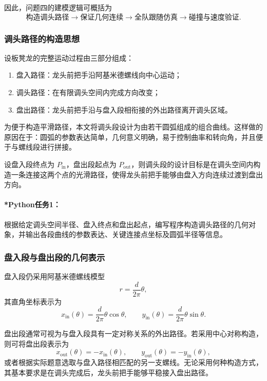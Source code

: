 \documentclass[12pt,a4paper]{ctexart}
\begin{document}
因此，问题四的建模逻辑可概括为
\[
\text{构造调头路径} \longrightarrow \text{保证几何连续} \longrightarrow \text{全队跟随仿真} \longrightarrow \text{碰撞与速度验证}.
\]

\subsubsection{调头路径的构造思想}
设板凳龙的完整运动过程由三部分组成：

\begin{enumerate}
    \item 盘入路径：龙头前把手沿阿基米德螺线向中心运动；
    \item 调头路径：在有限调头空间内完成方向改变；
    \item 盘出路径：龙头前把手沿与盘入段相衔接的外出路径离开调头区域。
\end{enumerate}

为便于构造平滑路径，本文将调头段设计为由若干圆弧组成的组合曲线。这样做的原因在于：圆弧的参数表达简单，几何意义明确，易于控制曲率和转向角，并且便于与螺线段进行拼接。

设盘入段终点为 $P_{\mathrm{in}}$，盘出段起点为 $P_{\mathrm{out}}$，则调头段的设计目标是在调头空间内构造一条连接这两个点的光滑路径，使得龙头前把手能够由盘入方向连续过渡到盘出方向。

\paragraph{*Python任务1：}
根据给定调头空间半径、盘入终点和盘出起点，编写程序构造调头路径的几何对象，并输出各段曲线的参数表达、关键连接点坐标及圆弧半径等信息。

\subsubsection{盘入段与盘出段的几何表示}
盘入段仍采用阿基米德螺线模型
\begin{equation}
r=\frac{d}{2\pi}\theta,
\end{equation}
其直角坐标表示为
\begin{equation}
x_{\mathrm{in}}(\theta)=\frac{d}{2\pi}\theta\cos\theta,
\qquad
y_{\mathrm{in}}(\theta)=\frac{d}{2\pi}\theta\sin\theta.
\end{equation}

盘出段通常可视为与盘入段具有一定对称关系的外出路径。若采用中心对称构造，则可将盘出段表示为
\begin{equation}
x_{\mathrm{out}}(\theta)=-x_{\mathrm{in}}(\theta),\qquad
y_{\mathrm{out}}(\theta)=-y_{\mathrm{in}}(\theta),
\end{equation}
或者根据实际题意选取与盘入路径相匹配的另一支螺线。无论采用何种构造方式，其基本要求是在调头完成后，龙头前把手能够平稳接入盘出路径。
\end{document}
